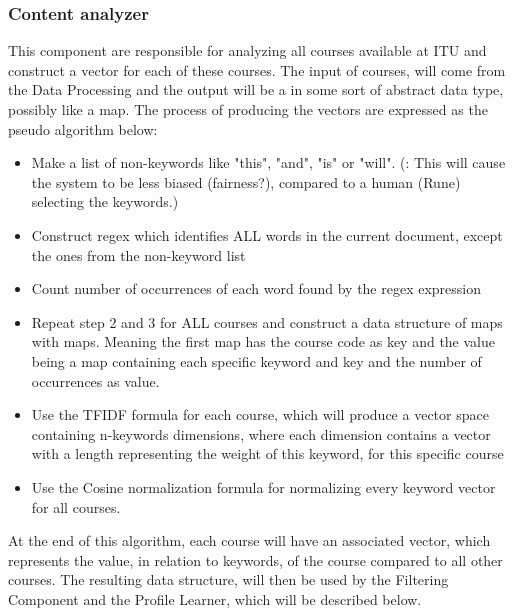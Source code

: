 \subsubsection{Content analyzer}
This component are responsible for analyzing all courses available at ITU and construct a vector for each of these courses. The input of courses, will come from the Data Processing  and the output will be a in some sort of abstract data type, possibly like a map. The process of producing the vectors are expressed as the pseudo algorithm below:
\begin{itemize}
	\item Make a list of non-keywords like "this", "and", "is" or "will". (: This will cause the system to be less biased (fairness?), compared to a human (Rune) selecting the keywords.)
	\item Construct regex which identifies ALL words in the current document, except the ones from the non-keyword list
	\item Count number of occurrences of each word found by the regex expression
	\item Repeat step 2 and 3 for ALL courses and construct a data structure of maps with maps. Meaning the first map has the course code as key and the value being a map containing each specific keyword and key and the number of occurrences as value. 
	\item Use the TFIDF  formula for each course, which will produce a vector space containing n-keywords dimensions, where each dimension contains a vector with a length representing the weight of this keyword, for this specific course 
	\item Use the Cosine normalization formula for normalizing every keyword vector for all courses.
\end{itemize}
At the end of this algorithm, each course will have an associated vector, which represents the value, in relation to keywords, of the course compared to all other courses. The resulting data structure, will then be used by the Filtering Component and the Profile Learner, which will be described below.

